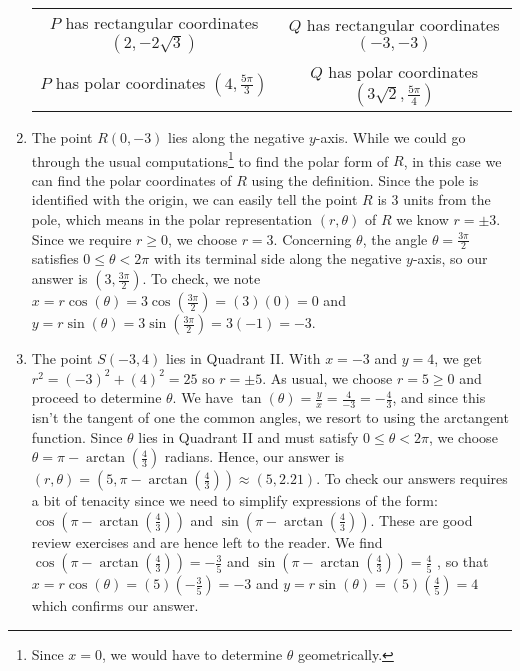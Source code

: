 \begin{ex}
\begin{enumerate}
\begin{center}
\begin{tabular}{cc}
$P$ has rectangular coordinates $(2,-2\sqrt{3})$ & $Q$ has rectangular coordinates $(-3,-3)$ \\
$P$ has polar coordinates $\left(4,\frac{5\pi}{3}\right)$ & $Q$ has polar coordinates $\left(3\sqrt{2}, \frac{5\pi}{4}\right)$  \\

\end{tabular}

\end{center}

\item The point $R(0,-3)$ lies along the negative $y$-axis.  While we could go through the usual computations\footnote{Since $x=0$, we would have to determine $\theta$ geometrically.} to find the polar form of $R$, in this case we can find the polar coordinates of $R$ using the definition. Since the pole is identified with the origin, we can easily tell the point $R$ is $3$ units from the pole, which means in the polar representation $(r, \theta)$ of $R$ we know $r = \pm 3$.  Since we require $r \geq 0$, we choose $r = 3$.  Concerning $\theta$, the angle $\theta = \frac{3\pi}{2}$ satisfies $0 \leq \theta < 2\pi$ with its terminal side along the negative $y$-axis, so our answer is $\left(3, \frac{3\pi}{2}\right)$.  To check, we note $x = r \cos(\theta) = 3 \cos\left( \frac{3\pi}{2}\right) = (3)(0) = 0$ and $y = r \sin(\theta) = 3 \sin\left( \frac{3\pi}{2}\right) = 3(-1) = -3$.

\item  The point $S(-3,4)$ lies in Quadrant II.  With $x = -3$ and $y = 4$, we get $r^2 = (-3)^2 + (4)^2 = 25$ so $r = \pm 5$.  As usual, we choose $r = 5 \geq 0$ and proceed to determine $\theta$.  We have $\tan(\theta) = \frac{y}{x} = \frac{4}{-3} = -\frac{4}{3}$, and since this isn't the tangent of one the common angles, we resort to using the arctangent function. Since $\theta$ lies in Quadrant II and must satisfy $0 \leq \theta < 2\pi$, we choose $\theta = \pi - \arctan\left(\frac{4}{3}\right)$ radians.  Hence, our answer is $(r,\theta) = \left(5, \pi - \arctan\left(\frac{4}{3}\right)\right) \approx (5,2.21)$.  To check our answers requires a bit of tenacity since we need to simplify expressions of the form:  $\cos\left(\pi - \arctan\left(\frac{4}{3}\right)\right)$ and $\sin\left(\pi - \arctan\left(\frac{4}{3}\right)\right)$.  These are good review exercises and are hence left to the reader.  We find  $\cos\left(\pi - \arctan\left(\frac{4}{3}\right)\right) = -\frac{3}{5}$ and $\sin\left(\pi - \arctan\left(\frac{4}{3}\right)\right) = \frac{4}{5}$ , so that $x = r \cos(\theta) = (5)\left(-\frac{3}{5}\right) = -3$ and $y = r \sin(\theta) = (5) \left(\frac{4}{5}\right) = 4$ which confirms our answer.


\end{enumerate}
\end{ex}
